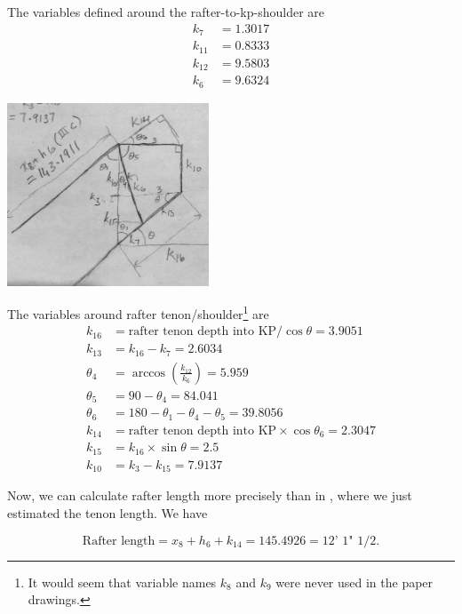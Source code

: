 \documentclass{article}\usepackage[]{graphicx}\usepackage[]{xcolor}
\begin{document}
The variables defined around the rafter-to-kp-shoulder are 
\begin{align*}
k_7 &= 1.3017\\
k_{11} &= 0.8333\\
k_{12} &= 9.5803\\
k_6 &= 9.6324
\end{align*}

\begin{center}
	\includegraphics[width=0.45\textwidth]{images/rafter_tenon_detail}
\end{center}

The variables around rafter tenon/shoulder\footnote{It would seem that variable names $k_8$ and $k_9$ were never used in the paper drawings.} are 
\begin{align*}
k_{16} &= \text{rafter tenon depth into KP}/\cos\theta = 3.9051\\
k_{13} &= k_{16} - k_7 = 2.6034\\
\theta_4 &= \arccos \left(\frac{k_{12}}{k_6}\right) = 5.959\\
\theta_5 &= 90 - \theta_4 = 84.041\\
\theta_6 &= 180 - \theta_1 - \theta_4 - \theta_5 = 39.8056\\
k_{14} &= \text{rafter tenon depth into KP} \times \cos\theta_6 = 2.3047\\
k_{15} &= k_{16} \times \sin\theta = 2.5\\
k_{10} &= k_3 - k_{15} = 7.9137
\end{align*}



Now, we can calculate rafter length more precisely than in , where we just estimated the tenon length. We have 

\[ \boxed{\text{Rafter length} = x_8 + h_6 + k_{14} = 145.4926 = \text{12' 1" 1/2}.}\]

 
\end{document}
